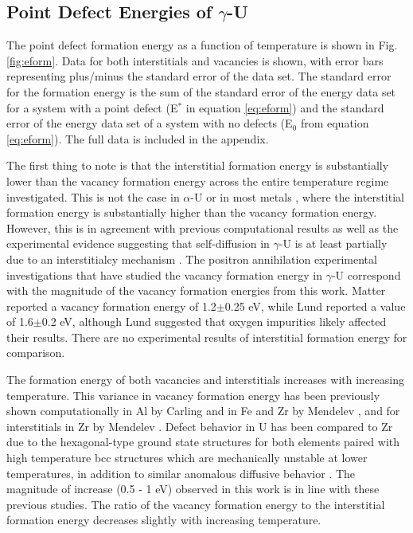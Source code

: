 \documentclass[review]{elsarticle}
\begin{document}
\subsection{Point Defect Energies of $\gamma$-U}

The point defect formation energy as a function of temperature is shown in Fig. \ref{fig:eform}. Data for both interstitials and vacancies is shown, with error bars representing plus/minus the standard error of the data set. The standard error for the formation energy is the sum of the standard error of the energy data set for a system with a point defect (E$^*$ in equation \ref{eq:eform}) and the standard error of the energy data set of a system with no defects (E$_0$ from equation \ref{eq:eform}). The full data is included in the appendix.

The first thing to note is that the interstitial formation energy is substantially lower than the vacancy formation energy across the entire temperature regime investigated. This is not the case in $\alpha$-U \cite{wirth2011} or in most metals \cite{schultz1968, baskes1979, lee2001, lee2003}, where the interstitial formation energy is substantially higher than the vacancy formation energy. However, this is in agreement with previous computational results \cite{beeler2010} as well as the experimental evidence suggesting that self-diffusion in $\gamma$-U is at least partially due to an interstitialcy mechanism \cite{fedorov1978, smirnov1992, mehrer2011}. The positron annihilation experimental investigations that have studied the vacancy formation energy in $\gamma$-U correspond with the magnitude of the vacancy formation energies from this work. Matter \cite{matter1980} reported a vacancy formation energy of 1.2$\pm$0.25 eV, while Lund \cite{lund2013} reported a value of 1.6$\pm$0.2 eV, although Lund suggested that oxygen impurities likely affected their results. There are no experimental results of interstitial formation energy for comparison.

The formation energy of both vacancies and interstitials increases with increasing temperature. This variance in vacancy formation energy has been previously shown computationally in Al by Carling \cite{carling2003} and in Fe and Zr by Mendelev \cite{mendelev2009, mendelev2010}, and for interstitials in Zr by Mendelev \cite{mendelev2010}. Defect behavior in U has been compared to Zr due to the hexagonal-type ground state structures for both elements paired with high temperature bcc structures which are mechanically unstable at lower temperatures, in addition to similar anomalous diffusive behavior \cite{matter1980,kidson1961}. The magnitude of increase (0.5 - 1 eV) observed in this work is in line with these previous studies. The ratio of the vacancy formation energy to the interstitial formation energy decreases slightly with increasing temperature.
\end{document}
